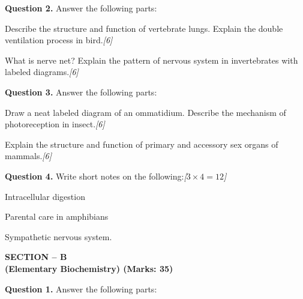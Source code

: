 \documentclass[11pt,a4paper]{article}
\newcommand{\pts}[1]{\hfill   \textit{[#1]}}
\begin{document}
\medskip


\noindent   \textbf{Question 2.} Answer the following parts:

\begin{parts}
  \item Describe the structure and function of vertebrate lungs. Explain the double ventilation process in bird.\pts{6}
  \item What is nerve net? Explain the pattern of nervous system in invertebrates with labeled diagrams.\pts{6}
\end{parts}

\medskip


\noindent   \textbf{Question 3.} Answer the following parts:

\begin{parts}
  \item Draw a neat labeled diagram of an ommatidium. Describe the mechanism of photoreception in insect.\pts{6}
  \item Explain the structure and function of primary and accessory sex organs of mammals.\pts{6}
\end{parts}

\medskip


\noindent   \textbf{Question 4.} Write short notes on the following:\pts{$3  \times 4 = 12$}

\begin{parts}
  \item Intracellular digestion
  \item Parental care in amphibians
  \item Sympathetic nervous system.
\end{parts}

\pagebreak

\begin{center}
   \textbf{SECTION -- B} \\
   \textbf{(Elementary Biochemistry) (Marks: 35)}
\end{center}

\medskip


\noindent   \textbf{Question 1.} Answer the following parts:
\end{document}
